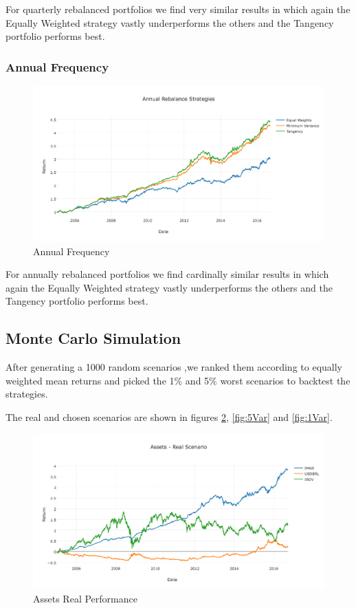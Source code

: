 \documentclass[paper=a4, fontsize=11pt]{scrartcl} %
\numberwithin{equation}{section} %
\numberwithin{figure}{section} %
\numberwithin{table}{section} %
\begin{document}
For quarterly rebalanced portfolios we find very similar results in which again the Equally Weighted strategy vastly underperforms the others and the Tangency portfolio performs best.

\subsubsection{Annual Frequency}

\begin{figure}[H]
  \includegraphics[width=\linewidth]{AStrat.png}
  \caption{Annual Frequency}
  \label{fig:AStrat}
\end{figure}

For annually rebalanced portfolios we find cardinally similar results in which again the Equally Weighted strategy vastly underperforms the others and the Tangency portfolio performs best.

\subsection{Monte Carlo Simulation}

After generating a 1000 random scenarios ,we ranked them according to equally weighted mean returns and picked the 1\% and 5\% worst scenarios to backtest the strategies.

The real and chosen scenarios are shown in figures \ref{fig:Real}, \ref{fig:5Var} and \ref{fig:1Var}.

\begin{figure}[H]
  \includegraphics[width=\linewidth]{Real.png}
  \caption{Assets Real Performance}
  \label{fig:Real}
\end{figure}
\end{document}
